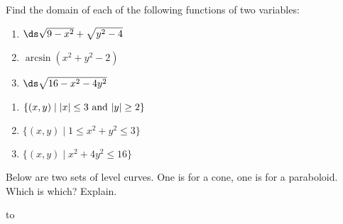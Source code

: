 \begin{enumialphparenastyle}
\begin{ex}
Find the domain of each of the following functions of two variables:
\begin{enumerate}
	\item	$\ds\sqrt{9-x^2}+\sqrt{y^2-4}$
	\item	$\arcsin(x^2+y^2-2)$
	\item	$\ds\sqrt{16-x^2-4y^2}$
\end{enumerate}
\begin{sol}
\begin{enumerate}
	\item	$\{(x,y)\mid |x|\le3\ \hbox{and}\ |y|\ge2\}$
	\item	$\{(x,y)\mid 1\le x^2+y^2\le3\}$
	\item	$\{(x,y)\mid x^2+4y^2\le16\}$
\end{enumerate}
\end{sol}
\end{ex}

\begin{ex}
Below are two sets of level curves.  One is for a cone, one
is for a paraboloid.  Which is which? Explain.

\nobreak
\hbox to 
\end{ex}

\end{enumialphparenastyle}
